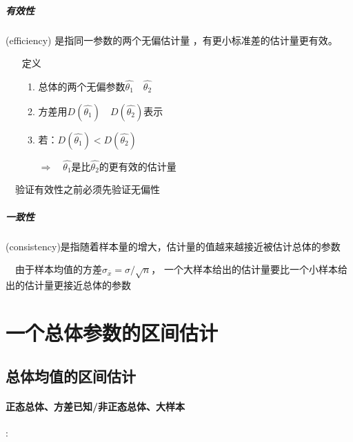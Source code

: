 \documentclass[UTF8,10pt]{book}
\begin{document}
                \subparagraph{有效性}
                    (efficiency) 是指同一参数的两个{\kaishu 无偏估计量} ，有更小标准差的估计量更有效。

                        \begin{itemize}
                            
                            \item [定义]{
                            \begin{enumerate}
                                \item 总体的两个{\kaishu 无偏参数}$\hat{\theta_1} \quad \hat{\theta_2}$
                                \item 方差用$D(\hat{\theta_1}) \quad D(\hat{\theta_2})$表示
                                \item 若：$D(\hat{\theta_1}) < D(\hat{\theta_2})$
                            
                                $\Rightarrow \quad \hat{\theta_1}$是比$\hat{\theta_2}$的更有效的估计量
                            \end{enumerate}
                            }
                        \end{itemize}

                        {\kaishu $\quad$验证有效性之前必须先验证无偏性}


                \subparagraph{一致性}
                    (consistency)是指随着样本量的增大，估计量的值越来越接近被估计总体的参数

                    {\kaishu $\quad$由于样本均值的方差$\sigma_{\overline{x}} = \sigma / \sqrt{n}$，
                    一个大样本给出的估计量要比一个小样本给出的估计量更接近总体的参数}
    
        \section{一个总体参数的区间估计}

            \subsection{总体均值的区间估计}
                
                \paragraph{正态总体、方差已知/非正态总体、大样本}:                        
\end{document}
